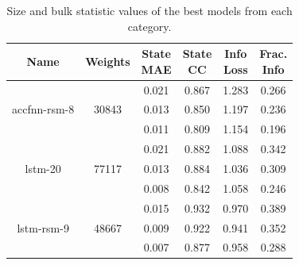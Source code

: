 \begin{table}[H]
    \centering
    \begin{tabular}{c|c|c|c|c|c}
Name &  Weights & \thead{State\\MAE} & \thead{State\\CC} & \thead{Info\\Loss} &\thead{Frac.\\Info}\\
\hline
\multirow{3}{6em}{accfnn-rsm-8} &  \multirow{3}{4em}{30843} & 0.021 & 0.867 & 1.283 & 0.266 \\ & & 0.013 & 0.850 & 1.197 & 0.236 \\ & & 0.011 & 0.809 & 1.154 & 0.196 \\
\hline
\multirow{3}{6em}{lstm-20} &  \multirow{3}{4em}{77117} & 0.021 & 0.882 & 1.088 & 0.342 \\ & & 0.013 & 0.884 & 1.036 & 0.309 \\ & & 0.008 & 0.842 & 1.058 & 0.246 \\
\hline
\multirow{3}{6em}{lstm-rsm-9} & \multirow{3}{4em}{48667} & 0.015 & 0.932 & 0.970 & 0.389 \\ & & 0.009 & 0.922 & 0.941 & 0.352 \\ & & 0.007 & 0.877 & 0.958 & 0.288 \\
    \end{tabular}

    \caption{Size and bulk statistic values of the best models from each category.}
    \label{model-init-best-table}
\end{table}

